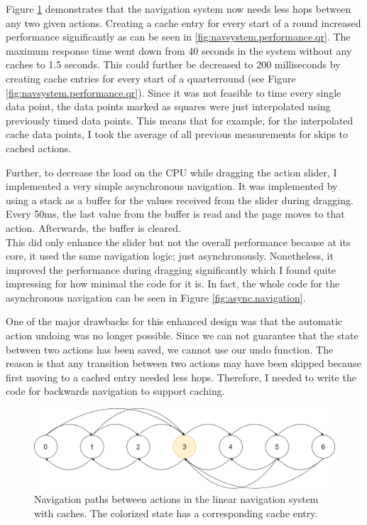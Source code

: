Figure \ref{fig:navsystem.cache.overview} demonstrates that the navigation system now needs less hops between any two given actions. Creating a cache entry for every start of a round increased performance significantly as can be seen in \ref{fig:navsystem.performance.qr}. The maximum response time went down from 40 seconds in the system without any caches to 1.5 seconds. This could further be decreased to 200 milliseconds by creating cache entries for every start of a quarterround (see Figure \ref{fig:navsystem.performance.qr}). Since it was not feasible to time every single data point, the data points marked as squares were just interpolated using previously timed data points. This means that for example, for the interpolated cache data points, I took the average of all previous measurements for skips to cached actions.

Further, to decrease the load on the CPU while dragging the action slider, I implemented a very simple asynchronous navigation. It was implemented by using a stack as a buffer for the values received from the slider during dragging. Every 50ms, the last value from the buffer is read and the page moves to that action. Afterwards, the buffer is cleared. \\
This did only enhance the slider but not the overall performance because at its core, it used the same navigation logic; just asynchronously. Nonetheless, it improved the performance during dragging significantly which I found quite impressing for how minimal the code for it is. In fact, the whole code for the asynchronous navigation can be seen in Figure \ref{fig:async.navigation}.

One of the major drawbacks for this enhanced design was that the automatic action undoing was no longer possible. Since we can not guarantee that the state between two actions has been saved, we cannot use our undo function. The reason is that any transition between two actions may have been skipped because first moving to a cached entry needed less hops. Therefore, I needed to write the code for backwards navigation to support caching.

\begin{figure}
\centering
\includegraphics[width=\textwidth]{figures/navigationsystem-diagram/navigationsystem-cache-overview-2.png}
\caption[Navigation paths in linear navigation system with caches]{Navigation paths between actions in the linear navigation system with caches. The colorized state has a corresponding cache entry.}
\label{fig:navsystem.cache.overview}
\end{figure}


